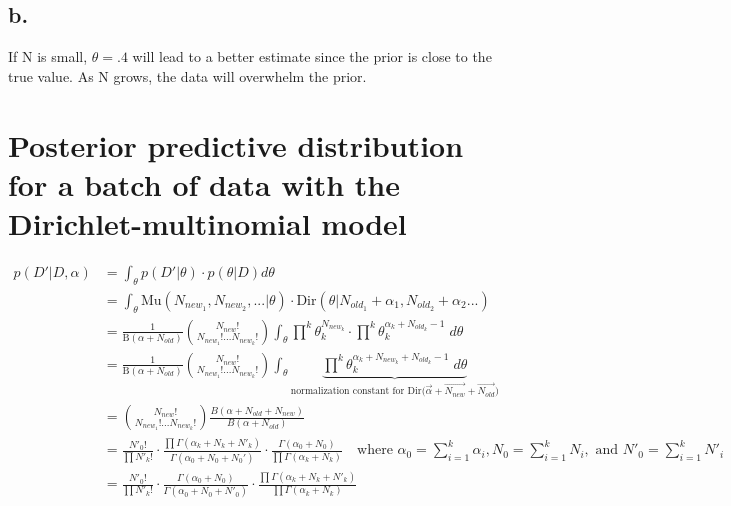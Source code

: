 \documentclass{article}
\begin{document}
\subsection{b.}
If N is small, $\theta = .4$ will lead to a better estimate since the
prior is close to the true value. As N grows, the data will overwhelm
the prior.

\section{Posterior predictive distribution for a batch of data with
the Dirichlet-multinomial model}
\label{3.13}

\begin{align*}
  p(D'|D,\alpha) &= \int_\theta p(D'|\theta) \cdot p(\theta|D) d\theta
  \\
                 &= \int_\theta \text{Mu}(N_{new_1}, N_{new_2},...|\theta) \cdot
                   \text{Dir}(\theta|N_{old_1} + \alpha_1, N_{old_2} + \alpha_2 ...)
  \\
                 &= \frac{1}{\text{B}(\alpha + N_{old})} {N_{new}!
                   \choose N_{new_1}! ... N_{new_k}!} \int_{\theta}
                   \prod^k \theta_k^{N_{new_k}} \cdot \prod^k
                   \theta_k^{\alpha_k + N_{old_k}
                   - 1} \; d\theta \\
                 &= \frac{1}{\text{B}(\alpha + N_{old})} {N_{new}!
                   \choose N_{new_1}! ... N_{new_k}!} \int_{\theta} \underbrace{
                   \prod^k \theta_k^{\alpha_k + N_{new_k} + N_{old_k}
                   - 1} \; d\theta}_{\text{normalization constant for
                   Dir($\vec{\alpha} + \vec{N_{new}} +
                   \vec{N_{old}}$)}} \\
                 &= {N_{new}! \choose N_{new_1}! ... N_{new_k}!}
                   \frac{B(\alpha + N_{old} + N_{new})}{B(\alpha +
                   N_{old})} \\
                 &= \frac{N'_0!}{\prod N'_k!} \cdot \frac{\prod
                   \Gamma(\alpha_k + N_k + N'_k)}{\Gamma(\alpha_0 + N_0
                   + N_0')} \cdot \frac{\Gamma(\alpha_0 + N_0)}{\prod
                   \Gamma(\alpha_k + N_k)} \quad \text{where
                   $\alpha_0 = \sum_{i=1}^k \alpha_i, N_0 = \sum_{i=1}^k
                   N_i, \text{ and } N'_0 = \sum_{i=1}^k N'_i$} \\
                 &= \frac{N'_0!}{\prod N'_k!} \cdot \frac{\Gamma(\alpha_0 +
                   N_0)}{\Gamma(\alpha_0 + N_0 + N'_0)} \cdot
                   \frac{\prod \Gamma(\alpha_k + N_k + N'_k)}{\prod
                   \Gamma(\alpha_k + N_k)}
\end{align*}
\end{document}
